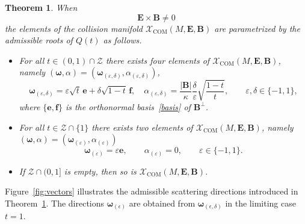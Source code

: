 \documentclass[12pt]{article}
\theoremstyle{plain}
\newtheorem{theorem}{Theorem}[section]
\theoremstyle{definition}
\begin{document}
\begin{theorem}\label{quadraticreduction}
When
\[
{\bm E}\times{\bm B}\neq0
\]
the elements of the collision manifold $\mathcal{X}_\mathrm{COM}(M,{\bm E}, {\bm B})$ are parametrized by the admissible roots of $Q(t)$ as follows. 
\begin{itemize}
\item[(i)] For all $t\in(0,1)\cap\mathcal{Z}$ there exists four elements of  $\mathcal{X}_\mathrm{COM}(M,{\bm E}, {\bm B})$, namely $(\bm\omega,\alpha)=({\bm \omega}_{(\varepsilon,\delta)},\alpha_{(\varepsilon,\delta)})$, 
\[
{\bm \omega}_{(\varepsilon,\delta)}=\varepsilon\sqrt{t}\,{\bm e}+\delta\sqrt{1-t}\,{\bm f},\quad 
\alpha_{(\varepsilon,\delta)}=\frac{|{\bm B}|}{\kappa}\frac{\delta}{\varepsilon}\sqrt{\frac{1-t}{t}},\qquad\varepsilon,\delta\in\{-1,1\},
\]
where $\{{\bm e},{\bm f}\}$ is the orthonormal basis~\eqref{basis} of ${\bm B}^{\perp}$. 
\item[(ii)]
For all $t\in\mathcal{Z}\cap\{1\}$ there exists two elements of  $\mathcal{X}_\mathrm{COM}(M,{\bm E}, {\bm B})$, namely $(\bm\omega,\alpha)=({\bm \omega}_{(\varepsilon)},\alpha_{(\varepsilon)})$
\[
{\bm \omega}_{(\varepsilon)}=\varepsilon{\bm e},\qquad\alpha_{(\varepsilon)}=0,\qquad\varepsilon\in\{-1,1\}.
\]
\item If $\mathcal{Z}\cap (0,1]$ is empty, then so is $\mathcal{X}_\mathrm{COM}(M,{\bm E}, {\bm B})$.
\end{itemize}
\end{theorem}
Figure~\ref{fig:vectors} illustrates the admissible scattering directions introduced in Theorem~\ref{quadraticreduction}. The directions $\bm\omega_{(\epsilon)}$ are obtained from $\bm\omega_{(\epsilon,\delta)}$ in the limiting case $t=1$.
\end{document}
